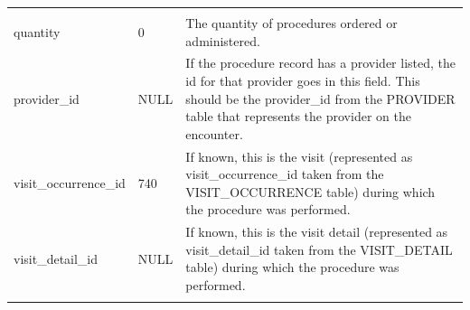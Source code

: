\documentclass[]{book}
\begin{document}
\begin{longtable}[]{@{}lll@{}}
\begin{minipage}[t]{0.48\columnwidth}
\end{minipage}\tabularnewline
\begin{minipage}[t]{0.30\columnwidth}\raggedright
quantity\strut
\end{minipage} & \begin{minipage}[t]{0.14\columnwidth}\raggedright
0\strut
\end{minipage} & \begin{minipage}[t]{0.48\columnwidth}\raggedright
The quantity of procedures ordered or administered.\strut
\end{minipage}\tabularnewline
\begin{minipage}[t]{0.30\columnwidth}\raggedright
provider\_id\strut
\end{minipage} & \begin{minipage}[t]{0.14\columnwidth}\raggedright
NULL\strut
\end{minipage} & \begin{minipage}[t]{0.48\columnwidth}\raggedright
If the procedure record has a provider listed, the id for that provider goes in this field. This should be the provider\_id from the PROVIDER table that represents the provider on the encounter.\strut
\end{minipage}\tabularnewline
\begin{minipage}[t]{0.30\columnwidth}\raggedright
visit\_occurrence\_id\strut
\end{minipage} & \begin{minipage}[t]{0.14\columnwidth}\raggedright
740\strut
\end{minipage} & \begin{minipage}[t]{0.48\columnwidth}\raggedright
If known, this is the visit (represented as visit\_occurrence\_id taken from the VISIT\_OCCURRENCE table) during which the procedure was performed.\strut
\end{minipage}\tabularnewline
\begin{minipage}[t]{0.30\columnwidth}\raggedright
visit\_detail\_id\strut
\end{minipage} & \begin{minipage}[t]{0.14\columnwidth}\raggedright
NULL\strut
\end{minipage} & \begin{minipage}[t]{0.48\columnwidth}\raggedright
If known, this is the visit detail (represented as visit\_detail\_id taken from the VISIT\_DETAIL table) during which the procedure was performed.\strut
\end{minipage}\tabularnewline
\begin{minipage}[t]{0.30\columnwidth}\raggedright

\end{minipage}
\end{longtable}
\end{document}
